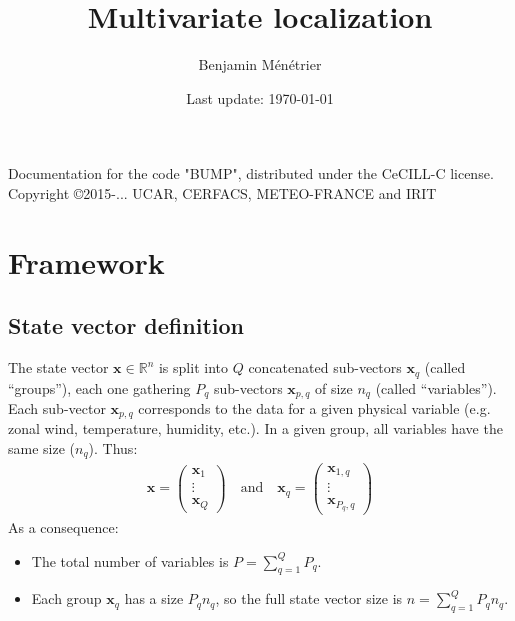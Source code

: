\documentclass[12pt]{scrartcl}
\begin{document}
\title{Multivariate localization}
\author{Benjamin Ménétrier}
\date{Last update: \today}

\thispagestyle{empty}

\maketitle
\begin{center}
Documentation for the code "BUMP", distributed under the CeCILL-C license.\\
Copyright \copyright 2015-... UCAR, CERFACS, METEO-FRANCE and IRIT
\end{center}

\tableofcontents

\clearpage


\section{Framework}

\subsection{State vector definition}
The state vector $\mathbf{x} \in \mathbb{R}^n$ is split into $Q$ concatenated sub-vectors $\mathbf{x}_q$ (called ``groups''), each one gathering $P_q$ sub-vectors $\mathbf{x}_{p,q}$ of size $n_q$ (called ``variables''). Each sub-vector $\mathbf{x}_{p,q}$ corresponds to the data for a given physical variable (e.g. zonal wind, temperature, humidity, etc.). In a given group, all variables have the same size ($n_q$). Thus:
\begin{align}
\mathbf{x} = \left( \begin{array}{c}
\mathbf{x}_1 \\[1ex]
\hline
\vdots \\
\hline
\mathbf{x}_Q
\end{array} \right) \quad \text{and} \quad \mathbf{x}_q = \left( \begin{array}{c}
\mathbf{x}_{1,q} \\[1ex]
\hline
\vdots \\
\hline
\mathbf{x}_{P_q,q}
\end{array} \right) 
\end{align}
As a consequence:
\begin{itemize}
\item The total number of variables is $\displaystyle P = \sum_{q=1}^Q P_q$.
\item Each group $\mathbf{x}_q$ has a size $P_q n_q$, so the full state vector size is $n = \displaystyle \sum_{q=1}^Q P_q n_q$.
\end{itemize}
\end{document}
